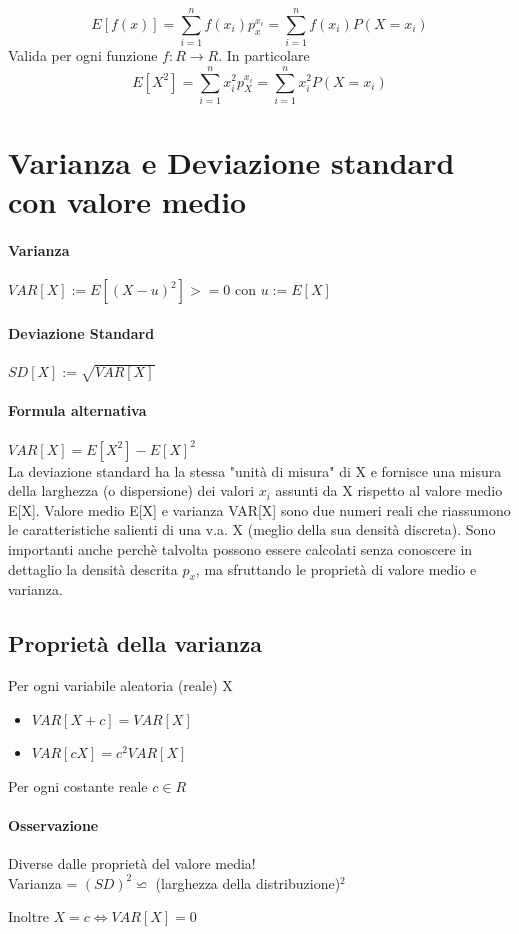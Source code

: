 \documentclass[12pt, a4paper, openany]{book}
\begin{document}
\begin{equation}
    E[f(x)] = \sum_{i = 1}^{n} f(x_i)p_x^{x_i}
= \sum_{i = 1}^{n}f(x_i)P(X = x_i)
\end{equation}
Valida per ogni funzione $f:R \to R$. In particolare
\begin{equation}
    E[X^2] = \sum_{i = 1}^{n} x_i^2 p_X^{x_i} = \sum_{i = 1}^{n} x_i^2P(X=x_i)
\end{equation}

\section{Varianza e Deviazione standard con valore medio}
\paragraph{Varianza} $VAR[X] := E[(X-u)^2] >= 0$ con $u:=E[X]$
\paragraph{Deviazione Standard} $SD[X] := \sqrt{VAR[X]}$
\paragraph{Formula alternativa} $VAR[X] = E[X^2] - E[X]^2$
\\ La deviazione standard ha la stessa "unità di misura" di X e fornisce 
una misura della larghezza (o dispersione) dei valori $x_i$ assunti da X rispetto
al valore medio E[X].
Valore medio E[X] e varianza VAR[X] sono due numeri reali che riassumono
le caratteristiche salienti di una v.a. X (meglio della sua densità discreta).
Sono importanti anche perchè talvolta possono essere calcolati
senza conoscere in dettaglio la densità descrita $p_x$, ma sfruttando le
proprietà di valore medio e varianza.

\subsection{Proprietà della varianza}
Per ogni variabile aleatoria (reale) X
\begin{itemize}
    \item $VAR[X+c] = VAR[X]$
    \item $VAR[cX] = c^2 VAR[X]$
\end{itemize}
Per ogni costante reale $c \in R$
\paragraph{Osservazione} Diverse dalle proprietà del valore media!
\\ Varianza = $(SD)^2 \backsimeq $ (larghezza della distribuzione)$^2$
\begin{center}
    Inoltre $X = c \Leftrightarrow VAR[X] = 0$
\end{center}
\end{document}
